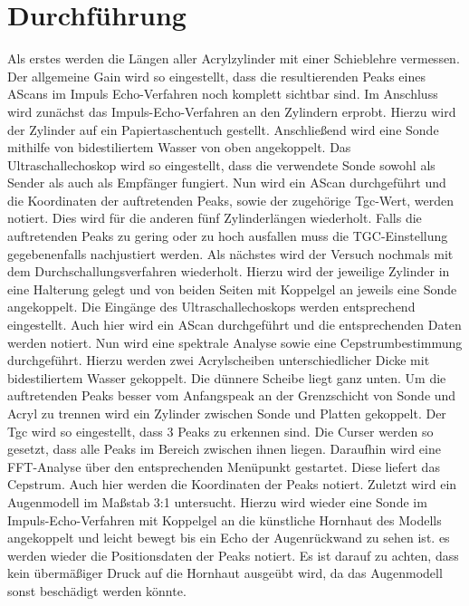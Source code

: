 
\section{Durchführung}
\label{sec:Durchführung}
Als erstes werden die Längen aller Acrylzylinder mit einer Schieblehre vermessen.
Der allgemeine Gain wird so eingestellt, dass die resultierenden Peaks eines AScans im Impuls Echo-Verfahren
noch komplett sichtbar sind.
Im Anschluss wird zunächst das Impuls-Echo-Verfahren an den Zylindern erprobt.
Hierzu wird der Zylinder auf ein Papiertaschentuch gestellt. Anschließend wird eine Sonde
 mithilfe von bidestiliertem Wasser von oben angekoppelt. Das Ultraschallechoskop
 wird so eingestellt, dass die verwendete Sonde sowohl als Sender als auch als Empfänger fungiert.
 Nun wird ein AScan durchgeführt und die Koordinaten der auftretenden Peaks, sowie der zugehörige Tgc-Wert, werden notiert.
 Dies wird für die anderen fünf Zylinderlängen wiederholt. Falls die auftretenden
 Peaks zu gering oder zu hoch ausfallen muss die TGC-Einstellung gegebenenfalls nachjustiert werden.
 Als nächstes wird der Versuch nochmals mit dem Durchschallungsverfahren wiederholt.
 Hierzu wird der jeweilige Zylinder in eine Halterung gelegt und von beiden
 Seiten mit Koppelgel an jeweils eine Sonde angekoppelt. Die Eingänge des Ultraschallechoskops
 werden entsprechend eingestellt. Auch hier wird ein AScan durchgeführt und die
 entsprechenden Daten werden notiert.
 Nun wird eine spektrale Analyse sowie eine Cepstrumbestimmung durchgeführt. Hierzu
 werden zwei Acrylscheiben unterschiedlicher Dicke mit bidestiliertem Wasser gekoppelt.
 Die dünnere Scheibe liegt ganz unten. Um die auftretenden Peaks besser vom
 Anfangspeak an der Grenzschicht von Sonde und Acryl zu trennen wird ein Zylinder
 zwischen Sonde und Platten gekoppelt. Der Tgc wird so eingestellt, dass 3 Peaks zu erkennen sind.
 Die Curser werden so gesetzt, dass alle Peaks im Bereich zwischen ihnen liegen. Daraufhin wird eine
 FFT-Analyse über den entsprechenden Menüpunkt gestartet. Diese liefert das Cepstrum.
 Auch hier werden die Koordinaten der Peaks notiert.
 Zuletzt wird ein Augenmodell im Maßstab 3:1 untersucht. Hierzu wird wieder eine
 Sonde im Impuls-Echo-Verfahren mit Koppelgel an die künstliche Hornhaut des Modells angekoppelt
 und leicht bewegt bis ein Echo der Augenrückwand zu sehen ist. es werden wieder
 die Positionsdaten der Peaks notiert. Es ist darauf zu achten, dass kein übermäßiger
 Druck auf die Hornhaut ausgeübt wird, da das Augenmodell sonst beschädigt werden könnte.
